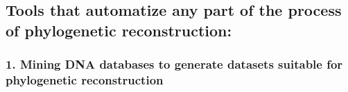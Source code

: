 \documentclass[]{article}
\begin{document}
\hypertarget{tools-that-automatize-any-part-of-the-process-of-phylogenetic-reconstruction}{%
\subsection{Tools that automatize any part of the process of phylogenetic reconstruction:}\label{tools-that-automatize-any-part-of-the-process-of-phylogenetic-reconstruction}}

\hypertarget{mining-dna-databases-to-generate-datasets-suitable-for-phylogenetic-reconstruction}{%
\subsubsection{1. Mining DNA databases to generate datasets suitable for phylogenetic reconstruction}\label{mining-dna-databases-to-generate-datasets-suitable-for-phylogenetic-reconstruction}}
\end{document}
